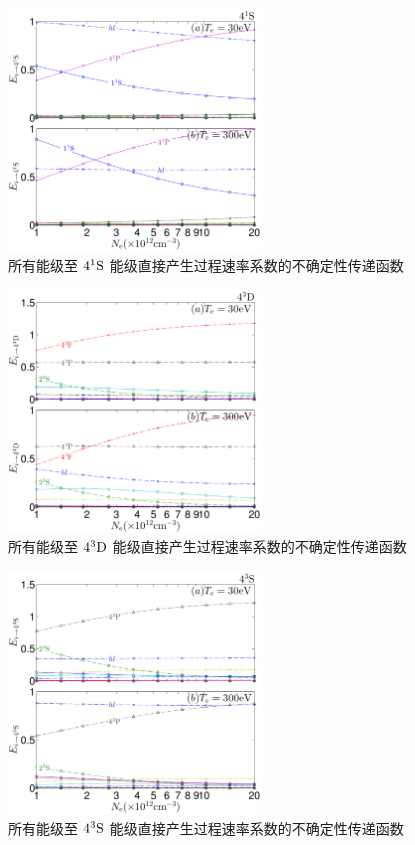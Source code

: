 \begin{figure}%
    \centering
    \includegraphics[width=0.6\textwidth]{41S-error-propagation-coefficient.pdf}
    \caption{所有能级至 $4^1{\rm S}$ 能级直接产生过程速率系数的不确定性传递函数}
    \label{fig:appendix:error-prop:3}
\end{figure}

\begin{figure}%
    \centering
    \includegraphics[width=0.6\textwidth]{43D-error-propagation-coefficient.pdf}
    \caption{所有能级至 $4^3{\rm D}$ 能级直接产生过程速率系数的不确定性传递函数}
    \label{fig:appendix:error-prop:4}
\end{figure}

\begin{figure}%
    \centering
    \includegraphics[width=0.6\textwidth]{43S-error-propagation-coefficient.pdf}
    \caption{所有能级至 $4^3{\rm S}$ 能级直接产生过程速率系数的不确定性传递函数}
    \label{fig:appendix:error-prop:5}
\end{figure}

